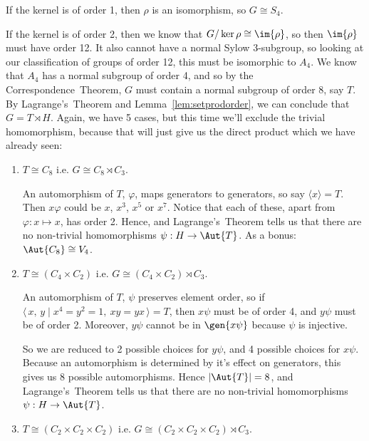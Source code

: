 If the kernel is of order 1, then \(\rho\) is an isomorphism, so \(G \cong S_4\).

If the kernel is of order 2, then we know that \(G/\ker{\rho} \cong \im{\rho}\), so then \(\im{\rho}\) must have order
12.
It also cannot have a normal Sylow 3-subgroup, so looking at our classification of groups of order 12, this must be
isomorphic to \(A_4\).
We know that \(A_4\) has a normal subgroup of order 4, and so by the Correspondence~Theorem, \(G\) must contain a normal
subgroup of order 8, say \(T\).
By Lagrange's~Theorem and Lemma~\ref{lem:setprodorder}, we can conclude that \(G = T \rtimes H\).
Again, we have 5 cases, but this time we'll exclude the trivial homomorphism, because that will just give us the direct
product which we have already seen:


\begin{enumerate}
    \item \(T \cong C_8\) i.e. \(G \cong C_8 \rtimes C_3\).

        An automorphism of \(T\), \(\varphi\), maps generators to generators, so say \(\langle x \rangle = T\).
        Then \(x\varphi\) could be \(x\), \(x^3\), \(x^5\) or \(x^7\).
        Notice that each of these, apart from \(\varphi:x \mapsto x\), has order 2.
        Hence, and Lagrange's~Theorem tells us that there are no non-trivial homomorphisms \(\psi:H \to \Aut{T}\).
        As a bonus: \(\Aut{C_8} \cong V_4\).

    \item \(T \cong (C_4 \times C_2)\) i.e. \(G \cong (C_4 \times C_2) \rtimes C_3\).

        An automorphism of \(T\), \(\psi\) preserves element order, so if \(\langle\,x,\,y \mid x^4 = y^2 = 1,\ xy =
        yx\,\rangle = T\), then \(x\psi\) must be of order 4, and \(y\psi\) must be of order 2.
        Moreover, \(y\psi\) cannot be in \(\gen{x\psi}\) because \(\psi\) is injective.

        So we are reduced to 2 possible choices for \(y\psi\), and 4 possible choices for \(x\psi\).
        Because an automorphism is determined by it's effect on generators, this gives us 8 possible automorphisms.
        Hence \(|\Aut{T}| = 8\), and Lagrange's~Theorem tells us that there are no non-trivial homomorphisms \(\psi:H
        \to \Aut{T}\).

    \item \(T \cong (C_2 \times C_2 \times C_2)\) i.e. \(G \cong (C_2 \times C_2 \times C_2) \rtimes C_3\).


\end{enumerate}
